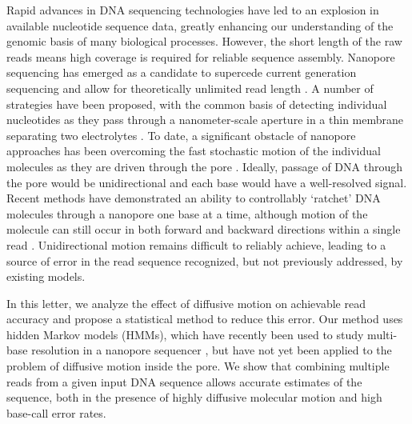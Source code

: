 \documentclass{biophys_letter}
\newcommand{\kje}[1]{\textcolor{BurntOrange}{#1}}
\begin{document}
\begin{multicols}{2}

Rapid advances in DNA sequencing technologies have led to an explosion in available nucleotide sequence data, greatly enhancing our understanding of the genomic basis of many biological processes.
However, the short length of the raw reads means high coverage is required for reliable sequence assembly.
Nanopore sequencing has emerged as a candidate to supercede current generation sequencing and allow for theoretically unlimited read length \cite{Branton:2008}.
A number of strategies have been proposed, with the common basis of detecting individual nucleotides as they pass through a nanometer-scale aperture in a thin membrane separating two electrolytes \cite{Winters-Hilt:2004}.
To date, a significant obstacle of nanopore approaches has been overcoming the fast stochastic motion of the individual molecules as they are driven through the pore \cite{Venkatesan:2011, Lu:2011}.
Ideally, passage of DNA through the pore would be unidirectional and each base would have a well-resolved signal.
Recent methods have demonstrated an ability to controllably `ratchet' DNA molecules through a nanopore one base at a time, although motion of the molecule can still occur in both forward and backward directions within a single read \cite{Luan:2011, Olasagasti:2010, Cherf:2012}.
Unidirectional motion remains difficult to reliably achieve, leading to a source of error in the read sequence recognized, but not previously addressed, by existing models.

In this letter, we analyze the effect of diffusive motion on achievable read accuracy and propose a statistical method to reduce this error.
Our method uses hidden Markov models (HMMs), which have recently been used to study multi-base resolution in a nanopore sequencer \cite{Timp:2012}, but have not yet been applied to the problem of diffusive motion inside the pore.
We show that combining multiple reads from a given input DNA sequence allows accurate estimates of the sequence, both in the presence of highly diffusive molecular motion and high base-call error rates.


\end{multicols}
\end{document}
